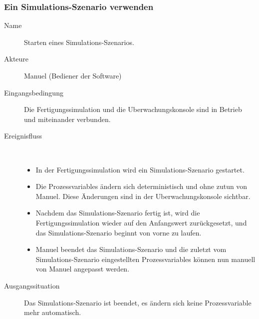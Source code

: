 \documentclass[parskip=full]{scrartcl}
\begin{document}
\subsubsection{Ein Simulations-Szenario verwenden}
\begin{description}
  \item[Name] Starten eines \gls{Simulations-Szenario}s.
  \item[Akteure] Manuel (Bediener der Software)
  \item[Eingangsbedingung] Die \gls{Fertigungssimulation} und die \gls{Uberwachungskonsole} sind in Betrieb und miteinander verbunden.
  \item[Ereignisfluss]~\\
  \begin{itemize}[noitemsep]
    \item In der \gls{Fertigungssimulation} wird ein \gls{Simulations-Szenario} gestartet.
    \item Die \glspl{Prozessvariable} ändern sich deterministisch und ohne zutun von Manuel. Diese Änderungen sind in der \gls{Uberwachungskonsole} sichtbar.
    \item Nachdem das \gls{Simulations-Szenario} fertig ist, wird die \gls{Fertigungssimulation} wieder auf den Anfangswert zurückgesetzt, und das
    \gls{Simulations-Szenario} beginnt von vorne zu laufen.
    \item Manuel beendet das \gls{Simulations-Szenario} und die zuletzt vom \gls{Simulations-Szenario} eingestellten \glspl{Prozessvariable} können nun manuell von Manuel angepasst werden.
  \end{itemize}
  \item[Ausgangssituation] Das \gls{Simulations-Szenario} ist beendet, es ändern sich keine \gls{Prozessvariable} mehr automatisch.
\end{description}
\end{document}
